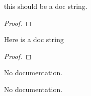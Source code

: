 
\begin{theorem}\label{List.aux}
        \leanok
                this should be a doc string.
    \end{theorem}

\begin{proof}
    \leanok
\end{proof}

\begin{theorem}\label{List.Nat.Ex}
        \leanok
                Here is a doc string
    \end{theorem}

\begin{proof}
    \leanok
\end{proof}

\begin{theorem}\label{List.test}
                No documentation.
    \end{theorem}

\begin{theorem}\label{List.Test}
                No documentation.
    \end{theorem}

